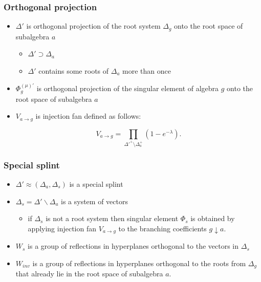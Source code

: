 \documentclass[pdftex]{beamer}
\theoremstyle{definition} \newtheorem{Def}{Definition}
\begin{document}
\begin{frame}
  \frametitle{Orthogonal projection}
  \begin{itemize}
  \item $\Delta'$ is orthogonal projection of the root system $\Delta_g$ onto the root space of subalgebra $a$
    \begin{itemize}
    \item $\Delta'\supset\Delta_a$
    \item $\Delta'$ contains some roots of $\Delta_a$ more than once
    \end{itemize}

  \item $\Phi_g^{(\mu)'}$ is orthogonal projection of the singular element of algebra $g$ onto the root space of subalgebra $a$ 
  \item $V_{a\rightarrow g}$ is injection fan defined as follows:

    \begin {equation}
      V_{a\rightarrow g}=\prod_{\Delta'^{+}\setminus \Delta_a^{+}}
      (1- e^{-\lambda}).
    \end {equation}
  \end{itemize}
\end{frame}

\begin{frame}
  \frametitle{Special splint}
  \begin{itemize}
  \item $\Delta'\approx\left(\Delta_a,\Delta_s\right)$ is a special splint
  \item $\Delta_s=\Delta' \backslash \Delta_a$ is a system of vectors
    \begin{itemize}
    \item if $\Delta_s$ is not a root system then singular element $\Phi_s$ is obtained by applying injection fan $V_{a\rightarrow g}$ to the branching coefficients $g\downarrow a$.
    \end{itemize}
  \item $W_s$ is a group of reflections in hyperplanes orthogonal to the vectors in $\Delta_s$
  \item $W_{inv}$ is a group of reflections in hyperplanes orthogonal to the roots from $\Delta_g$ that already lie in the root space of subalgebra $a$.
  \end{itemize}
\end{frame}
\end{document}
